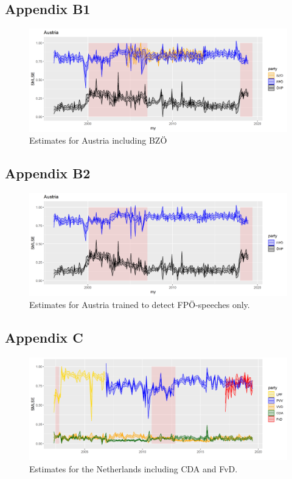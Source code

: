 \subsection*{Appendix B1}
\begin{figure}[ht!]
    \centering
    \includegraphics[width=\textwidth]{AT/vis/AT_fpvpbz_paper.png}
    \caption{Estimates for Austria including BZÖ}
    \label{fig:bzoe}
\end{figure}

\subsection*{Appendix B2}
\begin{figure}[ht!]
    \centering
    \includegraphics[width=\textwidth]{AT/vis/AT_fpvp_fpest_paper.png}
    \caption{Estimates for Austria trained to detect FPÖ-speeches only.}
    \label{fig:fponly}
\end{figure}
\newpage

\subsection*{Appendix C}
\begin{figure}[ht!]
    \centering
    \includegraphics[width=\textwidth]{NL/vis/nl_vvd_cda_rr.png}
    \caption{Estimates for the Netherlands including CDA and FvD.}
    \label{fig:cda}
\end{figure}

